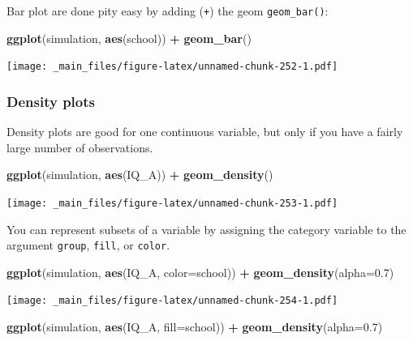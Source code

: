 \documentclass[
]{scrartcl}
\newenvironment{Shaded}{\begin{snugshade}}{\end{snugshade}}
\newcommand{\AttributeTok}[1]{\textcolor[rgb]{0.13,0.29,0.53}{#1}}
\newcommand{\FloatTok}[1]{\textcolor[rgb]{0.00,0.00,0.81}{#1}}
\newcommand{\FunctionTok}[1]{\textcolor[rgb]{0.13,0.29,0.53}{\textbf{#1}}}
\newcommand{\NormalTok}[1]{#1}
\newcommand{\SpecialCharTok}[1]{\textcolor[rgb]{0.81,0.36,0.00}{\textbf{#1}}}
\begin{document}
Bar plot are done pity easy by adding (\texttt{+}) the geom \texttt{geom\_bar()}:

\begin{Shaded}
\begin{Highlighting}[]
\FunctionTok{ggplot}\NormalTok{(simulation, }\FunctionTok{aes}\NormalTok{(school)) }\SpecialCharTok{+}
        \FunctionTok{geom\_bar}\NormalTok{()}
\end{Highlighting}
\end{Shaded}

\texttt{[image: \_main\_files/figure-latex/unnamed-chunk-252-1.pdf]}

\hypertarget{density-plots}{%
\subsubsection{Density plots}\label{density-plots}}

Density plots are good for one continuous variable, but only if you have a fairly large number of observations.

\begin{Shaded}
\begin{Highlighting}[]
\FunctionTok{ggplot}\NormalTok{(simulation, }\FunctionTok{aes}\NormalTok{(IQ\_A)) }\SpecialCharTok{+}
        \FunctionTok{geom\_density}\NormalTok{()}
\end{Highlighting}
\end{Shaded}

\texttt{[image: \_main\_files/figure-latex/unnamed-chunk-253-1.pdf]}

You can represent subsets of a variable by assigning the category variable to the argument \texttt{group}, \texttt{fill}, or \texttt{color}.

\begin{Shaded}
\begin{Highlighting}[]
\FunctionTok{ggplot}\NormalTok{(simulation, }\FunctionTok{aes}\NormalTok{(IQ\_A, }\AttributeTok{color=}\NormalTok{school)) }\SpecialCharTok{+}
        \FunctionTok{geom\_density}\NormalTok{(}\AttributeTok{alpha=}\FloatTok{0.7}\NormalTok{)}
\end{Highlighting}
\end{Shaded}

\texttt{[image: \_main\_files/figure-latex/unnamed-chunk-254-1.pdf]}

\begin{Shaded}
\begin{Highlighting}[]
\FunctionTok{ggplot}\NormalTok{(simulation, }\FunctionTok{aes}\NormalTok{(IQ\_A, }\AttributeTok{fill=}\NormalTok{school)) }\SpecialCharTok{+}
        \FunctionTok{geom\_density}\NormalTok{(}\AttributeTok{alpha=}\FloatTok{0.7}\NormalTok{)}
\end{Highlighting}
\end{Shaded}
\end{document}
